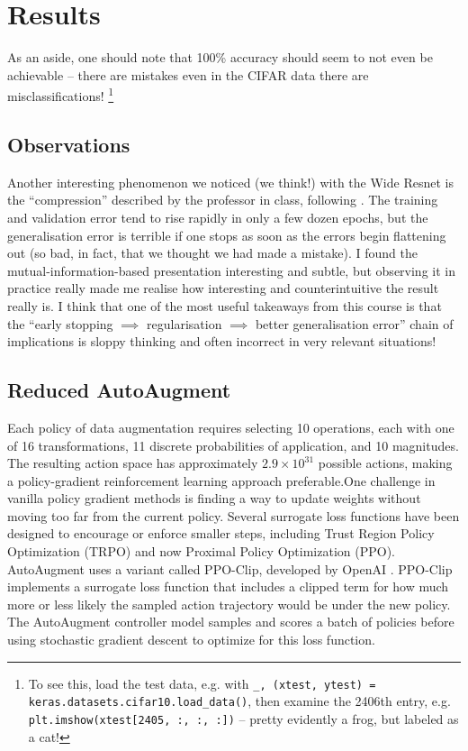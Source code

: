 \documentclass[10pt,twocolumn,letterpaper]{article}
\begin{document}
\section{Results}

	As an aside, one should note that 100\% accuracy should seem to not even be achievable -- there are mistakes even in the CIFAR data there are misclassifications!  \footnote{To see this, load the test data, e.g. with \texttt{\_, (xtest, ytest) = keras.datasets.cifar10.load\_data()}, then examine the 2406th entry, e.g. \texttt{plt.imshow(xtest[2405, :, :, :])} -- pretty evidently a frog, but labeled as a cat!}

	\subsection{Observations}

		Another interesting phenomenon we noticed (we think!) with the Wide Resnet is the ``compression'' described by the professor in class, following \cite{Shwartz-Ziv2017}. The training and validation error tend to rise rapidly in only a few dozen epochs, but the generalisation error is terrible if one stops as soon as the errors begin flattening out (so bad, in fact, that we thought we had made a mistake). I found the mutual-information-based presentation interesting and subtle, but observing it in practice really made me realise how interesting and counterintuitive the result really is. I think that one of the most useful takeaways from this course is that the ``early stopping $\implies$ regularisation $\implies$ better generalisation error'' chain of implications is sloppy thinking and often incorrect in very relevant situations!


	\subsection{Reduced AutoAugment}
		Each policy of data augmentation requires selecting 10 operations, each with one of 16 transformations, 11 discrete probabilities of application, and 10 magnitudes.  The resulting action space has approximately $2.9 \times 10^{31}$ possible actions, making a policy-gradient reinforcement learning approach preferable.One challenge in vanilla policy gradient methods is finding a way to update weights without moving too far from the current policy. Several surrogate loss functions have been designed to encourage or enforce smaller steps, including Trust Region Policy Optimization (TRPO) and now Proximal Policy Optimization (PPO). AutoAugment uses a variant called PPO-Clip, developed by OpenAI \cite{Schulman2017}. PPO-Clip implements a surrogate loss function that includes a clipped term for how much more or less likely the sampled action trajectory would be under the new policy. The AutoAugment controller model samples and scores a batch of policies before using stochastic gradient descent to optimize for this loss function.
\end{document}

